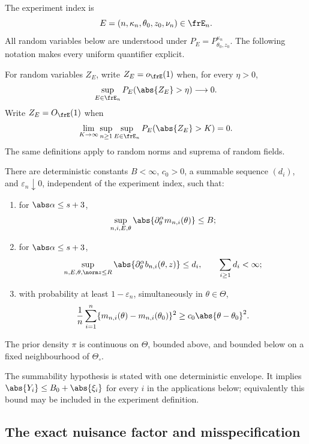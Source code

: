 The experiment index is
\[
 E=(n,\kappa_n,\theta_0,z_0,\nu_n)\in\frE_n.
\]
All random variables below are understood under
\(P_E=P_{\theta_0,z_0}^{\kappa_n}\).  The following notation makes every
uniform quantifier explicit.

\begin{definition}
\label{def:uniform-orders}
For random variables \(Z_E\), write \(Z_E=o_{\frE}(1)\) when, for every
\(\eta>0\),
\[
 \sup_{E\in\frE_n}P_E(\abs{Z_E}>\eta)\longrightarrow0.
\]
Write \(Z_E=O_{\frE}(1)\) when
\[
 \lim_{K\to\infty}\sup_{n\ge1}\sup_{E\in\frE_n}
 P_E(\abs{Z_E}>K)=0.
\]
The same definitions apply to random norms and suprema of random fields.
\end{definition}

\begin{assumption}
\label{ass:triangular}
There are deterministic constants \(B<\infty\), \(c_0>0\), a summable
sequence \((d_i)\), and \(\varepsilon_n\downarrow0\), independent of the
experiment index, such that:
\begin{enumerate}
\item for \(\abs\alpha\le s+3\),
\[
 \sup_{n,i,E,\theta}\abs{\partial_\theta^\alpha m_{n,i}(\theta)}\le B;
\]
\item for \(\abs\alpha\le s+3\),
\[
 \sup_{n,E,\theta,\norm z\le R}
 \abs{\partial_\theta^\alpha b_{n,i}(\theta,z)}\le d_i,
 \qquad \sum_{i\ge1}d_i<\infty;
\]
\item with probability at least \(1-\varepsilon_n\), simultaneously in
\(\theta\in\Theta\),
\begin{equation}
 \frac1n\sum_{i=1}^n
 \{m_{n,i}(\theta)-m_{n,i}(\theta_0)\}^2
 \ge c_0\abs{\theta-\theta_0}^2.
 \label{eq:abstract-contrast}
\end{equation}
\end{enumerate}
The prior density \(\pi\) is continuous on \(\Theta\), bounded above, and
bounded below on a fixed neighbourhood of \(\Theta_\circ\).
\end{assumption}

The summability hypothesis is stated with one deterministic envelope.  It
implies \(\abs{Y_i}\le B_0+\abs{\xi_i}\) for every \(i\) in the applications below;
equivalently this bound may be included in the experiment definition.

\subsection{The exact nuisance factor and misspecification}

